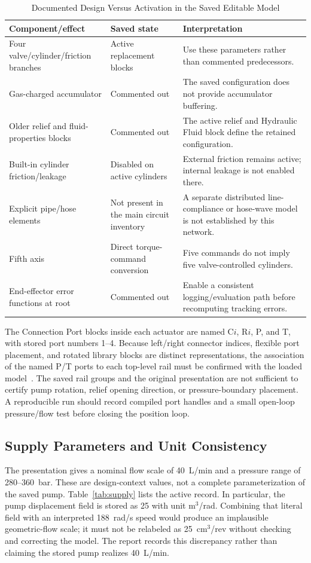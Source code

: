 \begin{table}[t]
\caption{Documented Design Versus Activation in the Saved Editable Model}
\label{tab:state}
\centering\small
\begin{tabular}{p{}p{}p{}}
\hline
Component/effect & Saved state & Interpretation\\\hline
Four valve/cylinder/friction branches & Active replacement blocks & Use these parameters rather than commented predecessors.\\
Gas-charged accumulator & Commented out & The saved configuration does not provide accumulator buffering.\\
Older relief and fluid-properties blocks & Commented out & The active relief and \textnormal{Hydraulic Fluid} block define the retained configuration.\\
Built-in cylinder friction/leakage & Disabled on active cylinders & External friction remains active; internal leakage is not enabled there.\\
Explicit pipe/hose elements & Not present in the main circuit inventory & A separate distributed line-compliance or hose-wave model is not established by this network.\\
Fifth axis & Direct torque-command conversion & Five commands do not imply five valve-controlled cylinders.\\
End-effector error functions at root & Commented out & Enable a consistent logging/evaluation path before recomputing tracking errors.\\\hline
\end{tabular}
\end{table}

The Connection Port blocks inside each actuator are named C$i$, R$i$, P, and T, with stored port numbers 1--4. Because left/right connector indices, flexible port placement, and rotated library blocks are distinct representations, the association of the named P/T ports to each top-level rail must be confirmed with the loaded model~\cite{connectionport}. The saved rail groups and the original presentation are not sufficient to certify pump rotation, relief opening direction, or pressure-boundary placement. A reproducible run should record compiled port handles and a small open-loop pressure/flow test before closing the position loop.

\subsection{Supply Parameters and Unit Consistency}
The presentation gives a nominal flow scale of 40~L/min and a pressure range of 280--360~bar. These are design-context values, not a complete parameterization of the saved pump. Table~\ref{tab:supply} lists the active record. In particular, the pump displacement field is stored as 25 with unit m$^3$/rad. Combining that literal field with an interpreted 188~rad/s speed would produce an implausible geometric-flow scale; it must not be relabeled as 25~cm$^3$/rev without checking and correcting the model. The report records this discrepancy rather than claiming the stored pump realizes 40~L/min.


